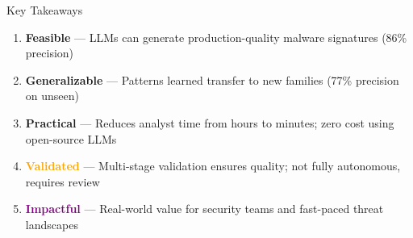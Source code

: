 \documentclass[11pt,aspectratio=16:9]{beamer}
\begin{document}
\begin{frame}{Key Takeaways}
  \vspace{0.5cm}
  \Large
  \begin{enumerate}
    \setlength\itemsep{0.8cm}
    
    \item {\textbf{\textcolor{accent1}{Feasible}}} — LLMs can generate production-quality malware signatures (86\% precision)
    
    \item {\textbf{\textcolor{accent2}{Generalizable}}} — Patterns learned transfer to new families (77\% precision on unseen)
    
    \item {\textbf{\textcolor{accent3}{Practical}}} — Reduces analyst time from hours to minutes; zero cost using open-source LLMs
    
    \item {\textbf{\textcolor{orange}{Validated}}} — Multi-stage validation ensures quality; not fully autonomous, requires review
    
    \item {\textbf{\textcolor{purple}{Impactful}}} — Real-world value for security teams and fast-paced threat landscapes
  \end{enumerate}
\end{frame}
\end{document}
